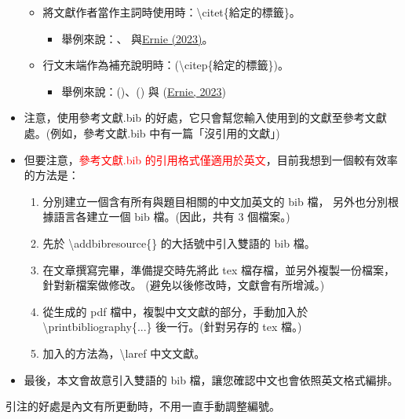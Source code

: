 \documentclass[utf8,12pt]{article} %
\begin{document}
\begin{spacing}{1.5}
\begin{itemize}
\begin{itemize}
		\item 將文獻作者當作主詞時使用時：\textbackslash citet\{給定的標籤\}。
		\begin{itemize}
			\item 舉例來說：\citet{中文文獻範例}、\citet{English_example} 與\hspace{1pt}\hyperref[StatEconLabCite]{Ernie (2023)}。
		\end{itemize}	
		\item 行文末端作為補充說明時：(\textbackslash citep\{給定的標籤\})。
        \begin{itemize}
			\item 舉例來說：(\citep{中文文獻範例, English_example})、(\citep{English_example}) 與 \hspace{1pt}(\hyperref[StatEconLabCite]{Ernie, 2023})
        \end{itemize}	
	\end{itemize}
	\item 注意，使用參考文獻.bib 的好處，它只會幫您輸入使用到的文獻至參考文獻處。(例如，參考文獻.bib 中有一篇「沒引用的文獻」)
	\item 但要注意，\textcolor{red}{參考文獻.bib 的引用格式僅適用於英文}，目前我想到一個較有效率的方法是：
		\begin{enumerate}[1]
			\item 分別建立一個含有所有與題目相關的中文加英文的 bib 檔，
			另外也分別根據語言各建立一個 bib 檔。(因此，共有 3 個檔案。)
			\item 先於 \textbackslash addbibresource\{\} 的大括號中引入雙語的 bib 檔。
			\item 在文章撰寫完畢，準備提交時先將此 tex 檔存檔，並另外複製一份檔案，針對新檔案做修改。 (避免以後修改時，文獻會有所增減。)
			\item 從生成的 pdf 檔中，複製中文文獻的部分，手動加入於 \textbackslash printbibliography\{...\} 後一行。(針對另存的 tex 檔。)
			\item 加入的方法為，\textbackslash laref 中文文獻。
		\end{enumerate}
	\item 最後，本文會故意引入雙語的 bib 檔，讓您確認中文也會依照英文格式編排。
\end{itemize}	
%
引注的好處是內文有所更動時，不用一直手動調整編號。
%
\end{spacing}
%
%
\end{document}
